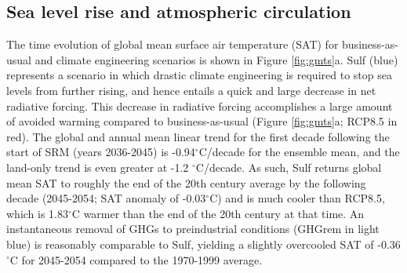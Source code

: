 \documentclass[grl]{AGUTeX}  %
\begin{document}
\begin{article}

\section{Sea level rise and atmospheric circulation}

The time evolution of global mean surface air temperature (SAT) for business-as-usual and climate engineering scenarios is shown in Figure \ref{fig:gmts}a. Sulf (blue) represents a scenario in which drastic climate engineering is required to stop sea levels from further rising, and hence entails a quick and large decrease in net radiative forcing. This decrease in radiative forcing accomplishes a large amount of avoided warming compared to business-as-usual (Figure \ref{fig:gmts}a; RCP8.5 in red). The global and annual mean linear trend for the first decade following the start of SRM (years 2036-2045) is -0.94$^\circ$C/decade for the ensemble mean, and the land-only trend is even greater at -1.2 $^\circ$C/decade. As such, Sulf returns global mean SAT to roughly the end of the 20th century average by the following decade (2045-2054; SAT anomaly of -0.03$^\circ$C) and is much cooler than RCP8.5, which is 1.83$^\circ$C warmer than the end of the 20th century at that time. An instantaneous removal of GHGs to preindustrial conditions (GHGrem in light blue) is reasonably comparable to Sulf, yielding a slightly overcooled SAT of -0.36$^\circ$C for 2045-2054 compared to the 1970-1999 average. %


\end{article}
\end{document}
